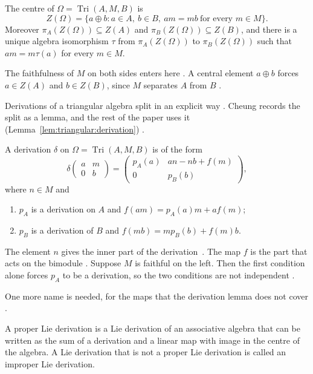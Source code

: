 \begin{proposition}\label{prop:triangular:centre}
The centre of $\Omega=\operatorname{Tri}(A,M,B)$ is
\[
Z(\Omega)=\{a\oplus b : a\in A,\ b\in B,\ am=mb\ \text{for every } m\in M\}.
\]
Moreover $\pi_A(Z(\Omega))\subseteq Z(A)$ and $\pi_B(Z(\Omega))\subseteq Z(B)$,
and there is a unique algebra isomorphism $\tau$ from $\pi_A(Z(\Omega))$ to
$\pi_B(Z(\Omega))$ such that $am=m\tau(a)$ for every $m\in M$.
\end{proposition}

The faithfulness of $M$ on both sides enters here \cite[p.~119]{Cheung2001}. A
central element $a\oplus b$ forces $a\in Z(A)$ and $b\in Z(B)$, since $M$
separates $A$ from $B$ \cite[p.~119]{Cheung2001}.

Derivations of a triangular algebra split in an explicit way
\cite[Lemma~5, p.~303]{Cheung2003}. Cheung records the
split as a lemma, and the rest of the paper uses it (Lemma~\ref{lem:triangular:derivation})
\cite[Lemma~5, p.~303]{Cheung2003}.\begin{lemma}\label{lem:triangular:derivation}
A derivation $\delta$ on $\Omega=\operatorname{Tri}(A,M,B)$ is of the form
\[
\delta\begin{pmatrix} a & m\\ 0 & b\end{pmatrix}
=\begin{pmatrix} p_A(a) & an-nb+f(m)\\ 0 & p_B(b)\end{pmatrix},
\]
where $n\in M$ and
\begin{enumerate}
\item $p_A$ is a derivation on $A$ and $f(am)=p_A(a)m+af(m)$;
\item $p_B$ is a derivation of $B$ and $f(mb)=mp_B(b)+f(m)b$.
\end{enumerate}
\end{lemma}

The element $n$ gives the inner part of the derivation~\cite[p.~303]{Cheung2003}. The map $f$ is the
part that acts on the bimodule \cite[p.~303]{Cheung2003}. Suppose $M$ is
faithful on the left. Then the first condition alone forces $p_A$ to be a
derivation, so the two conditions are not independent
\cite[p.~303]{Cheung2003}.

One more name is needed, for the maps that the derivation lemma does not cover
\cite[p.~299]{Cheung2003}.

\begin{definition}\label{def:triangular:proper-lie}
A proper Lie derivation is a Lie derivation of an associative algebra that can be
written as the sum of a derivation and a linear map with image in the centre of the
algebra. A Lie derivation that is not a proper Lie derivation is called an improper
Lie derivation.
\end{definition}

